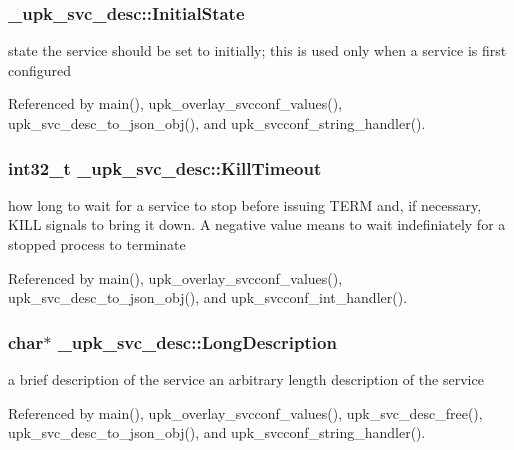 \subsubsection[{InitialState}]{ {\bf \_\-upk\_\-svc\_\-desc::InitialState}}\label{struct__upk__svc__desc_a49b38ed1095da250a2eb392d0cbc663d}
state the service should be set to initially; this is used only when a service is first configured 

Referenced by main(), upk\_\-overlay\_\-svcconf\_\-values(), upk\_\-svc\_\-desc\_\-to\_\-json\_\-obj(), and upk\_\-svcconf\_\-string\_\-handler().

\subsubsection[{KillTimeout}]{\setlength{\rightskip}{0pt plus 5cm}int32\_\-t {\bf \_\-upk\_\-svc\_\-desc::KillTimeout}}\label{struct__upk__svc__desc_ad1af978bc37d07566232e0d48427a7cb}
how long to wait for a service to stop before issuing TERM and, if necessary, KILL signals to bring it down. A negative value means to wait indefiniately for a stopped process to terminate 

Referenced by main(), upk\_\-overlay\_\-svcconf\_\-values(), upk\_\-svc\_\-desc\_\-to\_\-json\_\-obj(), and upk\_\-svcconf\_\-int\_\-handler().

\subsubsection[{LongDescription}]{\setlength{\rightskip}{0pt plus 5cm}char$\ast$ {\bf \_\-upk\_\-svc\_\-desc::LongDescription}}\label{struct__upk__svc__desc_accc7f57b9fd49138d83e1fb9def41bcb}
a brief description of the service an arbitrary length description of the service 

Referenced by main(), upk\_\-overlay\_\-svcconf\_\-values(), upk\_\-svc\_\-desc\_\-free(), upk\_\-svc\_\-desc\_\-to\_\-json\_\-obj(), and upk\_\-svcconf\_\-string\_\-handler().

